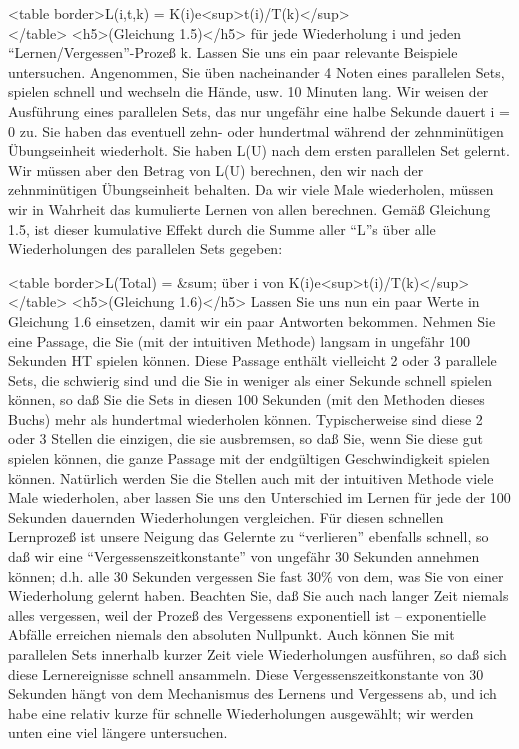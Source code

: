 <table border>L(i,t,k) = K(i)e<sup>\-t(i)/T(k)</sup> \\ </table>
<h5>(Gleichung 1.5)</h5>
für jede Wiederholung i und jeden \enquote{Lernen/Vergessen}-Prozeß k.
Lassen Sie uns ein paar relevante Beispiele untersuchen.
Angenommen, Sie üben nacheinander 4 Noten eines parallelen Sets, spielen schnell und wechseln die Hände, usw. 10 Minuten lang.
Wir weisen der Ausführung eines parallelen Sets, das nur ungefähr eine halbe Sekunde dauert i = 0 zu.
Sie haben das eventuell zehn- oder hundertmal während der zehnminütigen Übungseinheit wiederholt.
Sie haben L(U) nach dem ersten parallelen Set gelernt.
Wir müssen aber den Betrag von L(U) berechnen, den wir nach der zehnminütigen Übungseinheit behalten.
Da wir viele Male wiederholen, müssen wir in Wahrheit das kumulierte Lernen von allen berechnen.
Gemäß Gleichung 1.5, ist dieser kumulative Effekt durch die Summe aller \enquote{L}s über alle Wiederholungen des parallelen Sets gegeben:

<table border>L(Total) = &sum; über i von K(i)e<sup>\-t(i)/T(k)</sup> \\ </table>
<h5>(Gleichung 1.6)</h5>
Lassen Sie uns nun ein paar Werte in Gleichung 1.6 einsetzen, damit wir ein paar Antworten bekommen.
Nehmen Sie eine Passage, die Sie (mit der intuitiven Methode) langsam in ungefähr 100 Sekunden HT spielen können.
Diese Passage enthält vielleicht 2 oder 3 parallele Sets, die schwierig sind und die Sie in weniger als einer Sekunde schnell spielen können, so daß Sie die Sets in diesen 100 Sekunden (mit den Methoden dieses Buchs) mehr als hundertmal wiederholen können.
Typischerweise sind diese 2 oder 3 Stellen die einzigen, die sie ausbremsen, so daß Sie, wenn Sie diese gut spielen können, die ganze Passage mit der endgültigen Geschwindigkeit spielen können.
Natürlich werden Sie die Stellen auch mit der intuitiven Methode viele Male wiederholen, aber lassen Sie uns den Unterschied im Lernen für jede der 100 Sekunden dauernden Wiederholungen vergleichen.
Für diesen schnellen Lernprozeß ist unsere Neigung das Gelernte zu \enquote{verlieren} ebenfalls schnell, so daß wir eine \enquote{Vergessenszeitkonstante} von ungefähr 30 Sekunden annehmen können; d.h. alle 30 Sekunden vergessen Sie fast 30\% von dem, was Sie von einer Wiederholung gelernt haben.
Beachten Sie, daß Sie auch nach langer Zeit niemals alles vergessen, weil der Prozeß des Vergessens exponentiell ist -- exponentielle Abfälle erreichen niemals den absoluten Nullpunkt.
Auch können Sie mit parallelen Sets innerhalb kurzer Zeit viele Wiederholungen ausführen, so daß sich diese Lernereignisse schnell ansammeln.
Diese Vergessenszeitkonstante von 30 Sekunden hängt von dem Mechanismus des Lernens und Vergessens ab, und ich habe eine relativ kurze für schnelle Wiederholungen ausgewählt; wir werden unten eine viel längere untersuchen.

